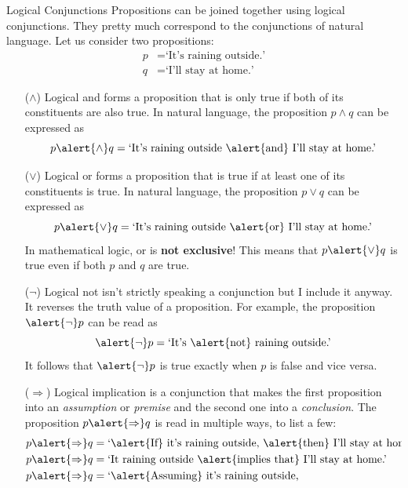 \documentclass[final]{beamer}
\newlength{\colwidth}
\begin{document}
\begin{frame}[t]
\begin{columns}[t]
\begin{column}{\colwidth}
 \begin{exampleblock}{Logical Conjunctions}
  Propositions can be joined together using \alert{logical conjunctions}. They
  pretty much correspond to the conjunctions of natural language. Let us
  consider two propositions:
  \begin{align*}
   p &= \text{`It's raining outside.'}\\
   q &= \text{`I'll stay at home.'}
  \end{align*}
  \begin{itemize}[left=40pt]
   \item[($ \wedge $)] Logical \alert{and} forms a proposition that is only
    \alert{true} if both of its constituents are also \alert{true}. In natural
    language, the proposition $p \wedge q$ can be expressed as
    \[
     p \alert{ \wedge } q = \text{`It's raining outside \alert{and} I'll stay at
     home.'}
    \]
   \item[($ \vee $)] Logical \alert{or} forms a proposition that is \alert{true}
    if at least one of its constituents is \alert{true}. In natural language,
    the proposition $p \vee q$ can be expressed as
    \[
     p \alert{ \vee } q = \text{`It's raining outside \alert{or} I'll stay at
     home.'}
    \]
    In mathematical logic, \alert{or} is \textbf{not exclusive}! This means that
    $p \alert{ \vee } q$ is true even if both $p$ and $q$ are true.
   \item[($\neg $)] Logical \alert{not} isn't strictly speaking a conjunction
    but I include it anyway. It reverses the truth value of a proposition. For
    example, the proposition $\alert{\neg }p$ can be read as
    \[
     \alert{\neg }p = \text{`It's \alert{not} raining outside.'}
    \]
    It follows that $\alert{\neg }p$ is \alert{true} exactly when $p$ is
    \alert{false} and vice versa.
   \item[($ \Rightarrow $)] Logical \alert{implication} is a conjunction that
    makes the first proposition into an \emph{assumption} or \emph{premise} and
    the second one into a \emph{conclusion}. The proposition $p \alert{
    \Rightarrow } q$ is read in multiple ways, to list a few: 
    \begin{align*}
     p \alert{ \Rightarrow } q &= \text{`\alert{If} it's raining outside,
    \alert{then} I'll stay at home.'}\\
     p \alert{ \Rightarrow } q &= \text{`It raining outside \alert{implies that}
     I'll stay at home.'}\\
     p \alert{ \Rightarrow } q &= \text{`\alert{Assuming} it's raining outside,
}
\end{align*}
\end{itemize}
\end{exampleblock}
\end{column}
\end{columns}
\end{frame}
\end{document}
